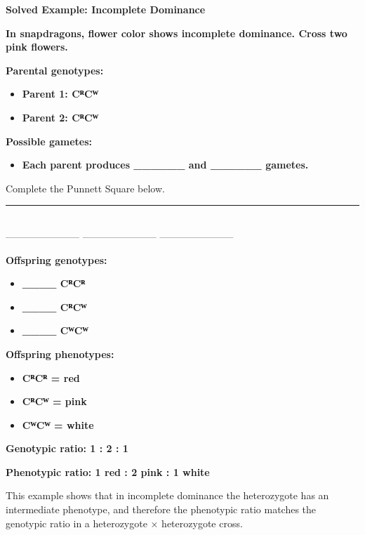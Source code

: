 \documentclass[
  letterpaper,
  DIV=11,
  numbers=noendperiod]{scrreprt}
\providecommand{\tightlist}{%
  \setlength{\itemsep}{0pt}\setlength{\parskip}{0pt}}
\begin{document}
\textbf{Solved Example: Incomplete Dominance}

\textbf{In snapdragons, flower color shows incomplete dominance. Cross
two pink flowers.}

\textbf{Parental genotypes:}

\begin{itemize}
\item
  \textbf{Parent 1: CᴿCᵂ}
\item
  \textbf{Parent 2: CᴿCᵂ}
\end{itemize}

\textbf{Possible gametes:}

\begin{itemize}
\tightlist
\item
  \textbf{Each parent produces \_\_\_\_\_\_ and \_\_\_\_\_\_ gametes.}
\end{itemize}

Complete the Punnett Square below.

\begin{center}\rule{0.5\linewidth}{0.5pt}\end{center}

\textbf{~~}\\
----------------------- ----------------------- -----------------------

\textbf{Offspring genotypes:}

\begin{itemize}
\item
  \textbf{\_\_\_\_ CᴿCᴿ}
\item
  \textbf{\_\_\_\_ CᴿCᵂ}
\item
  \textbf{\_\_\_\_ CᵂCᵂ}
\end{itemize}

\textbf{Offspring phenotypes:}

\begin{itemize}
\item
  \textbf{CᴿCᴿ = red}
\item
  \textbf{CᴿCᵂ = pink}
\item
  \textbf{CᵂCᵂ = white}
\end{itemize}

\textbf{Genotypic ratio: 1 : 2 : 1}

\textbf{Phenotypic ratio: 1 red : 2 pink : 1 white}

This example shows that in incomplete dominance the heterozygote has an
intermediate phenotype, and therefore the phenotypic ratio matches the
genotypic ratio in a heterozygote × heterozygote cross.
\end{document}
